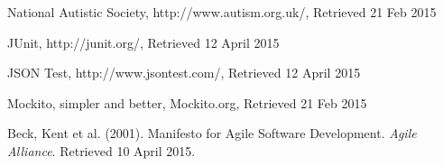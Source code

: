 \documentclass[a4paper, 11pt]{article}
\begin{document}
\begin{thebibliography}{100}
 National Autistic Society, http://www.autism.org.uk/, Retrieved 21 Feb 2015

 JUnit, http://junit.org/, Retrieved 12 April 2015

 JSON Test, http://www.jsontest.com/, Retrieved 12 April 2015


 Mockito, simpler and better, Mockito.org, Retrieved 21 Feb 2015

 Beck, Kent et al. (2001). Manifesto for Agile Software Development. \textit{Agile Alliance}. Retrieved 10 April 2015.

\end{thebibliography}
\end{document}
